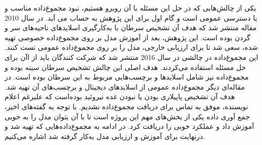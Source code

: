 
یکی از چالش‌هایی که در حل این مسئله با آن روبرو هستیم، نبود مجموع‌داده مناسب و با دسترسی عمومی است و گام اول برای این پژوهش به حساب می آید.
در سال 2010 مقاله \cite{halicek2019head} منتشر شد که هدف آن تشخیص سرطان با به‌کارگیری اسلاید‌های ناحیه‌های سر و گردن بوده است.
این پژوهش، بعد از آموزش مدل بر روی مجموع‌داده خصوصی تهیه شده، سعی شد تا برای ارزیابی خارجی، مدل را بر روی مجموع‌داده عمومی  تست کنند. این مجموع‌داده در چالشی در سال 2016 منتشر شد که شرکت کنندگان باید از اآن برای حل مسئله استفاده می‌کردند. هدف اصلی این چالش تشخیص سرطان سینه بوده و مجموع‌داده نیز شامل اسلاید‌ها و برچسب‌هایی مربوط به این سرطان بوده است.
در مقاله‌ای دیگر \cite{bohland2021machine} مجموع‌داده عمومی از اسلاید‌های دیجیتال و برچسب‌های آن تهیه شد. هدف آن تشخیص پاپیلاری بودن یا نبودن غده تیروئید بوده‌است که علیرغم اعلام نویسنده، موفق به تماس برای دریافت مجموع‌داده نشدیم.
با توجه به گفته‌های اخیر، جمع آوری داده یکی از بخش‌های مهم این پروژه است تا با آن بتوان مدل را به خوبی آموزش داد و عملکرد خوبی را دریافت کرد.
در ادامه به مجموع‌داده‌هایی که تهیه شد و درنهایت برای آموزش و ارزیابی مدل به‌کار گرفته شد اشاره می‌کنیم.



